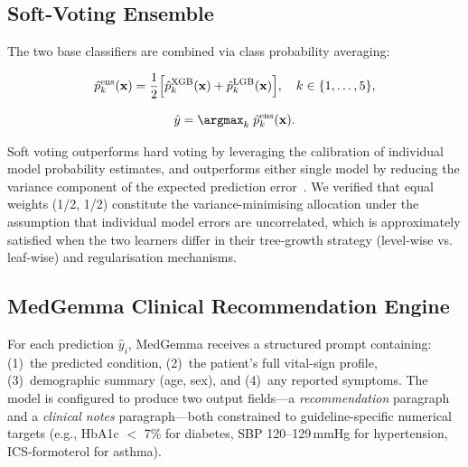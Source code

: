 \documentclass[journal]{IEEEtran}
\begin{document}
\subsection{Soft-Voting Ensemble}

The two base classifiers are combined via class probability averaging:

\begin{equation}
  \hat{p}^{\text{ens}}_k(\mathbf{x}) =
    \frac{1}{2}\Bigl[\hat{p}^{\text{XGB}}_k(\mathbf{x})
    + \hat{p}^{\text{LGB}}_k(\mathbf{x})\Bigr],
  \quad k \in \{1,\ldots,5\},
  \label{eq:ensemble}
\end{equation}

\begin{equation}
  \hat{y} = \argmax_{k}\; \hat{p}^{\text{ens}}_k(\mathbf{x}).
  \label{eq:predict}
\end{equation}

\noindent Soft voting outperforms hard voting by leveraging the calibration
of individual model probability estimates, and outperforms either single
model by reducing the variance component of the expected prediction
error~\cite{zhou2021}. We verified that equal weights (1/2, 1/2)
constitute the variance-minimising allocation under the assumption that
individual model errors are uncorrelated, which is approximately satisfied
when the two learners differ in their tree-growth strategy (level-wise vs.
leaf-wise) and regularisation mechanisms.

\subsection{MedGemma Clinical Recommendation Engine}

For each prediction $\hat{y}_i$, MedGemma receives a structured prompt
containing: (1)~the predicted condition, (2)~the patient's full vital-sign
profile, (3)~demographic summary (age, sex), and (4)~any reported symptoms.
The model is configured to produce two output fields—a \textit{recommendation}
paragraph and a \textit{clinical notes} paragraph—both constrained to
guideline-specific numerical targets (e.g., HbA1c $<$ 7\% for diabetes,
SBP 120--129\,mmHg for hypertension, ICS-formoterol for asthma).
\end{document}
